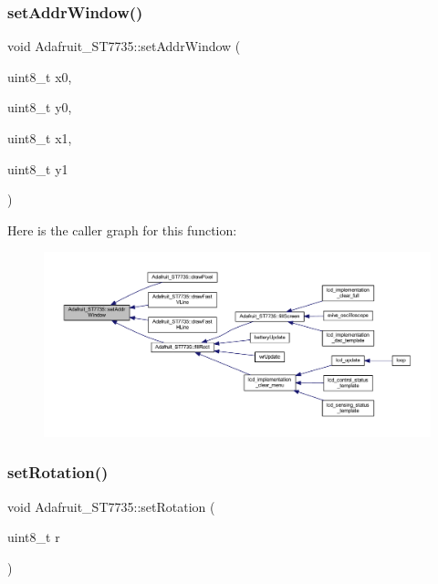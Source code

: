 \subsubsection{\texorpdfstring{set\+Addr\+Window()}{setAddrWindow()}}
{\footnotesize\ttfamily void Adafruit\+\_\+\+S\+T7735\+::set\+Addr\+Window (\begin{DoxyParamCaption}\item[{uint8\+\_\+t}]{x0,  }\item[{uint8\+\_\+t}]{y0,  }\item[{uint8\+\_\+t}]{x1,  }\item[{uint8\+\_\+t}]{y1 }\end{DoxyParamCaption})}

Here is the caller graph for this function\+:\nopagebreak
\begin{figure}[H]
\begin{center}
\leavevmode
\includegraphics[width=350pt]{class_adafruit___s_t7735_ade48a8b2ba1e6375c5e3dbeaf84c44dd_icgraph}
\end{center}
\end{figure}
\mbox{\label{class_adafruit___s_t7735_aae15fa049e0aff62d58d8773182a87de}} 
\subsubsection{\texorpdfstring{set\+Rotation()}{setRotation()}}
{\footnotesize\ttfamily void Adafruit\+\_\+\+S\+T7735\+::set\+Rotation (\begin{DoxyParamCaption}\item[{uint8\+\_\+t}]{r }\end{DoxyParamCaption})}

\mbox{\label{class_adafruit___s_t7735_ac945c3d179185563dc2bfae09ac35375}} 
